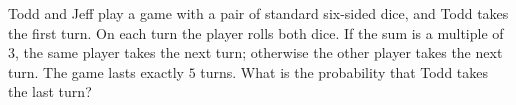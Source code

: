 Todd and Jeff play a game with a pair of standard six-sided dice, and Todd takes the first turn. On each turn the player rolls both dice. If the sum is a multiple of $3$, the same player takes the next turn; otherwise the other player takes the next turn. The game lasts exactly $5$ turns. What is the probability that Todd takes the last turn?
